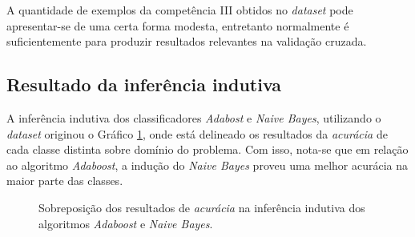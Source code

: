 A quantidade de exemplos da competência III obtidos no \textit{dataset} pode 
apresentar-se de uma certa forma modesta, entretanto normalmente é 
suficientemente para produzir resultados relevantes na validação cruzada.

\subsection{Resultado da inferência indutiva}

A inferência indutiva dos classificadores \textit{Adabost} e 
\textit{Naive Bayes}, utilizando o \textit{dataset} originou o Gráfico 
\ref{graphic:acuracia}, onde está delineado os resultados da 
\textit{acurácia} de cada classe distinta sobre domínio do problema. Com isso, 
nota-se que em relação ao algoritmo \textit{Adaboost}, a indução do 
\textit{Naive Bayes} proveu uma melhor acurácia na maior parte das classes.

\begin{figure}[H]
    \begin{center}
    \end{center}
    \caption{Sobreposição dos resultados de \textit{acurácia} na inferência  
    indutiva dos algoritmos \textit{Adaboost} e \textit{Naive Bayes}.}
    \label{graphic:acuracia}
\end{figure}

